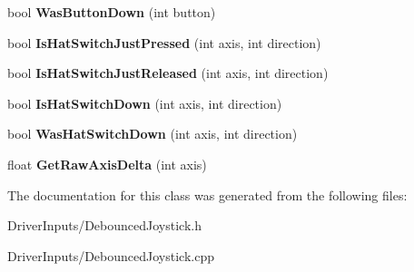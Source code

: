 \begin{DoxyCompactItemize}
\item 
\hypertarget{class_debounced_joystick_a69052711c5a3b0a1e723c30c65fc260f}{
bool {\bfseries \-Was\-Button\-Down} (int button)}
\label{class_debounced_joystick_a69052711c5a3b0a1e723c30c65fc260f}

\item 
\hypertarget{class_debounced_joystick_aa98033cb45bcf87f205d5179e7b50a91}{
bool {\bfseries \-Is\-Hat\-Switch\-Just\-Pressed} (int axis, int direction)}
\label{class_debounced_joystick_aa98033cb45bcf87f205d5179e7b50a91}

\item 
\hypertarget{class_debounced_joystick_a325328a180b9615fa931d44f22a4a271}{
bool {\bfseries \-Is\-Hat\-Switch\-Just\-Released} (int axis, int direction)}
\label{class_debounced_joystick_a325328a180b9615fa931d44f22a4a271}

\item 
\hypertarget{class_debounced_joystick_a0cc4670f7290cafc50b7b0ca030312f1}{
bool {\bfseries \-Is\-Hat\-Switch\-Down} (int axis, int direction)}
\label{class_debounced_joystick_a0cc4670f7290cafc50b7b0ca030312f1}

\item 
\hypertarget{class_debounced_joystick_af2e9ca9f8c816de7b692f5702857713c}{
bool {\bfseries \-Was\-Hat\-Switch\-Down} (int axis, int direction)}
\label{class_debounced_joystick_af2e9ca9f8c816de7b692f5702857713c}

\item 
\hypertarget{class_debounced_joystick_afc8b599ca5caf0b86b58da4f0eb959e9}{
float {\bfseries \-Get\-Raw\-Axis\-Delta} (int axis)}
\label{class_debounced_joystick_afc8b599ca5caf0b86b58da4f0eb959e9}

\end{DoxyCompactItemize}


\-The documentation for this class was generated from the following files\-:\begin{DoxyCompactItemize}
\item 
\-Driver\-Inputs/\-Debounced\-Joystick.\-h\item 
\-Driver\-Inputs/\-Debounced\-Joystick.\-cpp\end{DoxyCompactItemize}
